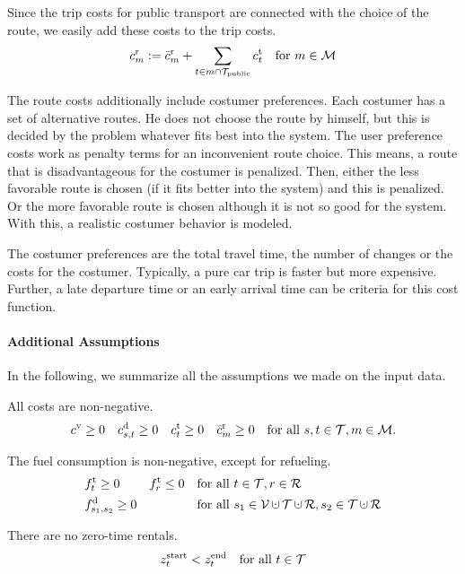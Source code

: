 Since the trip costs for public transport are connected with the choice of the route, we easily add these costs to the trip costs.
\begin{align*}
	c^{\operatorname{r}}_m := \bar{c}^{\operatorname{r}}_m + \sum_{t\in m\cap\mathcal{T}_{\operatorname{public}}}c^{\operatorname{t}}_t && \text{for } m\in\mathcal{M}
\end{align*}

The route costs additionally include costumer preferences. Each costumer has a set of alternative routes. He does not choose the route by himself, but this is decided by the problem whatever fits best into the system. The user preference costs work as penalty terms for an inconvenient route choice. This means, a route that is disadvantageous for the costumer is penalized. Then, either the less favorable route is chosen (if it fits better into the system) and this is penalized. Or the more favorable route is chosen although it is not so good for the system. With this, a realistic costumer behavior is modeled.

The costumer preferences are \eg the total travel time, the number of changes or the costs for the costumer. Typically, a pure car trip is faster but more expensive. Further, a late departure time or an early arrival time can be criteria for this cost function.

\paragraph{Additional Assumptions} \parfill

In the following, we summarize all the assumptions we made on the input data.

All costs are non-negative.
\begin{align}
\label{eq:nonnegativ_cost}
	c^{\operatorname{v}}\geq 0 && c^{\operatorname{d}}_{s,t}\geq 0 && c^{\operatorname{t}}_t\geq 0 && \bar{c}^{\operatorname{r}}_m\geq 0 && \text{for all } s,t\in\mathcal{T}, m\in\mathcal{M}.
\end{align}

The fuel consumption is non-negative, except for refueling.
\begin{align}
	& \ft_t\geq 0 && \ft_r\leq 0 && \text{for all } t\in\mathcal{T}, r\in\mathcal{R} \\
	& \fd_{s_1,s_2} \geq 0 &&&& \text{for all } s_1\in\mathcal{V}\cupdot\mathcal{T}\cupdot\mathcal{R},s_2\in\mathcal{T}\cupdot\mathcal{R}
\end{align}

There are no zero-time rentals.
\begin{align}
\label{eq:notime_trip}
	z^{\operatorname{start}}_t < z^{\operatorname{end}}_t && \text{for all } t\in\mathcal{T}
\end{align}

